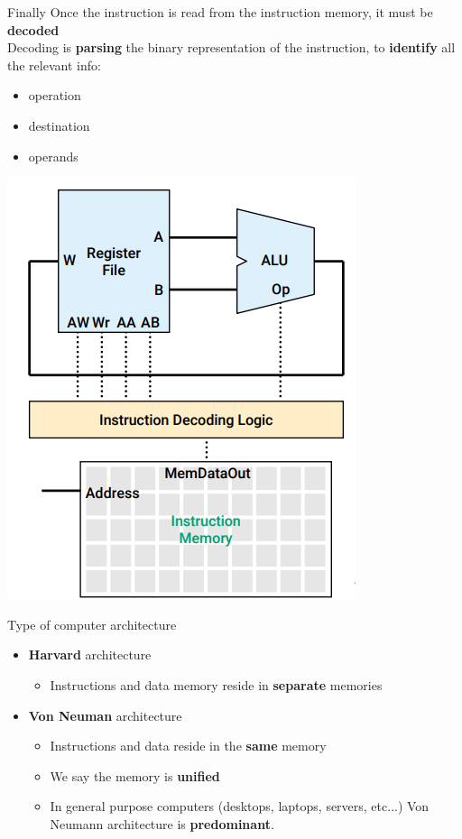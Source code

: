\begin{parag}{Finally}
    Once the instruction is read from the instruction memory, it must be \textbf{decoded}\\
    Decoding is \textbf{parsing} the binary representation of the instruction, to \textbf{identify} all the relevant info:
    \begin{itemize}
        \item operation
        \item destination
        \item operands
    \end{itemize}
    \begin{center}
        \includegraphics[scale=0.4]{182025-06-20.png}
    \end{center}
\end{parag}
\begin{parag}{Type of computer architecture}
    \begin{itemize}
        \item \textbf{Harvard} architecture
            \begin{itemize}
                \item Instructions and data memory reside in \textbf{separate} memories
            \end{itemize}
        \item \textbf{Von Neuman} architecture
            \begin{itemize}
                \item Instructions and data reside in the \textbf{same} memory
                \item We say the memory is \textbf{unified}
                \item In general purpose computers (desktops, laptops, servers, etc...) Von Neumann architecture is \textbf{predominant}.
            \end{itemize}
            
    \end{itemize}
    
\end{parag}

